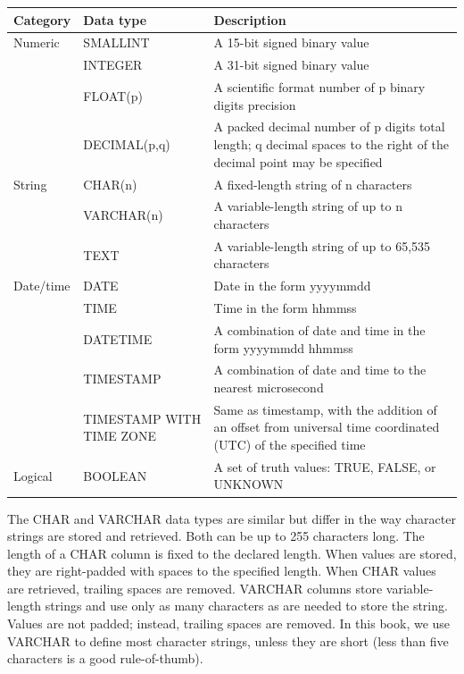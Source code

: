 \documentclass[
]{article}
\begin{document}
\begin{longtable}[]{@{}
  >{\raggedright\arraybackslash}p{}
  >{\raggedright\arraybackslash}p{}
  >{\raggedright\arraybackslash}p{}@{}}
\toprule
Category & Data type & Description \\
\midrule
\endhead
Numeric & SMALLINT & A 15-bit signed binary value \\
& INTEGER & A 31-bit signed binary value \\
& FLOAT(p) & A scientific format number of p binary digits precision \\
& DECIMAL(p,q) & A packed decimal number of p digits total length; q decimal spaces to the right of the decimal point may be specified \\
String & CHAR(n) & A fixed-length string of n characters \\
& VARCHAR(n) & A variable-length string of up to n characters \\
& TEXT & A variable-length string of up to 65,535 characters \\
Date/time & DATE & Date in the form yyyymmdd \\
& TIME & Time in the form hhmmss \\
& DATETIME & A combination of date and time in the form yyyymmdd hhmmss \\
& TIMESTAMP & A combination of date and time to the nearest microsecond \\
& TIMESTAMP WITH TIME ZONE & Same as timestamp, with the addition of an offset from universal time coordinated (UTC) of the specified time \\
Logical & BOOLEAN & A set of truth values: TRUE, FALSE, or UNKNOWN \\
\bottomrule
\end{longtable}

The CHAR and VARCHAR data types are similar but differ in the way character strings are stored and retrieved. Both can be up to 255 characters long. The length of a CHAR column is fixed to the declared length. When values are stored, they are right-padded with spaces to the specified length. When CHAR values are retrieved, trailing spaces are removed. VARCHAR columns store variable-length strings and use only as many characters as are needed to store the string. Values are not padded; instead, trailing spaces are removed. In this book, we use VARCHAR to define most character strings, unless they are short (less than five characters is a good rule-of-thumb).
\end{document}
